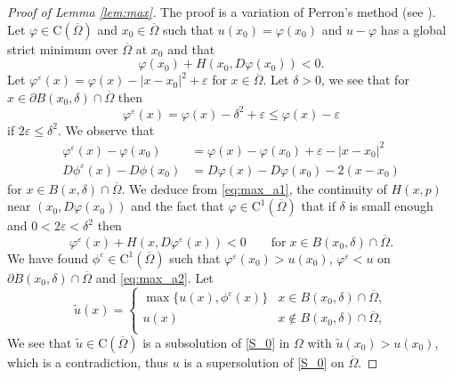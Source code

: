 \documentclass[11pt,reqno]{amsart}
\numberwithin{figure}{section}
\theoremstyle{plain}
\theoremstyle{remark}
\numberwithin{equation}{section}
\newcommand{\rmC}{\mathrm{C}}
\begin{document}
\begin{appendices}
\begin{proof}[Proof of Lemma \ref{lem:max}] The proof is a variation of Perron's method (see \cite{Capuzzo-Dolcetta1990}). Let $\varphi\in \rmC(\overline{\Omega})$ and $x_0\in \overline{\Omega}$ such that $u(x_0) = \varphi(x_0)$ and $u-\varphi$ has a global strict minimum over $\overline{\Omega}$ at $x_0$ and that 
\begin{equation}\label{eq:max_a1}
      \varphi(x_0) + H(x_0,D\varphi(x_0)) < 0.
\end{equation}
Let $\varphi^\varepsilon(x) = \varphi(x) - |x-x_0|^2 + \varepsilon$ for $x\in \overline{\Omega}$. Let $\delta > 0$, we see that for $x\in \partial B(x_0,\delta)\cap \overline{\Omega}$ then
\begin{equation*}
    \varphi^\varepsilon(x) = \varphi(x) - \delta^2 +\varepsilon \leq \varphi(x) - \varepsilon
\end{equation*}
if $2\varepsilon \leq \delta^2$. We observe that
\begin{equation*}
    \begin{split}
    \varphi^\varepsilon(x) - \varphi(x_0)  &= \varphi(x)-\varphi(x_0) + \varepsilon - |x-x_0|^2 \\
    D\phi^\varepsilon(x) - D\phi(x_0) &= D\varphi(x) - D\varphi(x_0) - 2(x-x_0)
    \end{split}
\end{equation*}
for $x\in B(x,\delta)\cap \overline{\Omega}$. We deduce from \eqref{eq:max_a1}, the continuity of $H(x,p)$ near $(x_0,D\varphi(x_0))$ and the fact that $\varphi\in \rmC^1(\overline{\Omega})$ that if $\delta$ is small enough and $0<2\varepsilon < \delta^2$ then
\begin{equation}\label{eq:max_a2}
      \varphi^\varepsilon(x)+H(x,D\varphi^\varepsilon(x)) < 0 \qquad\text{for}\;x\in B(x_0,\delta)\cap \overline{\Omega}.
\end{equation}
We have found $\phi^\varepsilon\in \mathrm{C}^1(\overline{\Omega})$ such that $\varphi^\varepsilon(x_0)>u(x_0)$, $\varphi^\varepsilon<u$ on $\partial B(x_0,\delta)\cap \overline{\Omega}$ and \eqref{eq:max_a2}. Let
\begin{equation*}
    \tilde{u}(x) = \begin{cases}
    \max \big\lbrace u(x),\phi^\varepsilon(x) \big\rbrace &x\in B(x_0,\delta)\cap \overline{\Omega},\\
    u(x)&x\notin B(x_0,\delta)\cap \overline{\Omega},\\
    \end{cases}
\end{equation*}
We see that $\tilde{u}\in \rmC(\overline{\Omega})$ is a subsolution of \eqref{S_0} in $\Omega$ with $\tilde{u}(x_0) > u(x_0)$, which is a contradiction, thus $u$ is a supersolution of \eqref{S_0} on $\overline{\Omega}$.
\end{proof}



\end{appendices}
\end{document}
